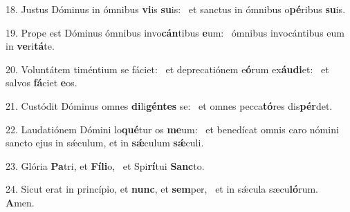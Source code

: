 18. Justus Dóminus in ómnibus \textbf{vi}is \textbf{su}is: \ast\  et sanctus in ómnibus o\textbf{pé}ribus \textbf{su}is.\

19. Prope est Dóminus ómnibus invo\textbf{cán}tibus \textbf{e}um: \ast\  ómnibus invocántibus eum in \textbf{ve}ri\textbf{tá}te.\

20. Voluntátem timéntium se fáciet: \dag\  et deprecatiónem e\textbf{ó}rum ex\textbf{áu}\textbf{di}et: \ast\  et salvos \textbf{fá}ciet \textbf{e}os.\

21. Custódit Dóminus omnes \textbf{di}li\textbf{gén}\textbf{tes} se: \ast\  et omnes pecca\textbf{tó}res dis\textbf{pér}det.\

22. Laudatiónem Dómini lo\textbf{qué}tur os \textbf{me}um: \ast\  et benedícat omnis caro nómini sancto ejus in sǽculum, et in \textbf{sǽ}culum \textbf{sǽ}culi.\

23. Glória \textbf{Pa}tri, et \textbf{Fí}\textbf{li}o, \ast\  et Spi\textbf{rí}tui \textbf{Sanc}to.\

24. Sicut erat in princípio, et \textbf{nunc}, et \textbf{sem}per, \ast\  et in sǽcula sæcu\textbf{ló}rum. \textbf{A}men.\

